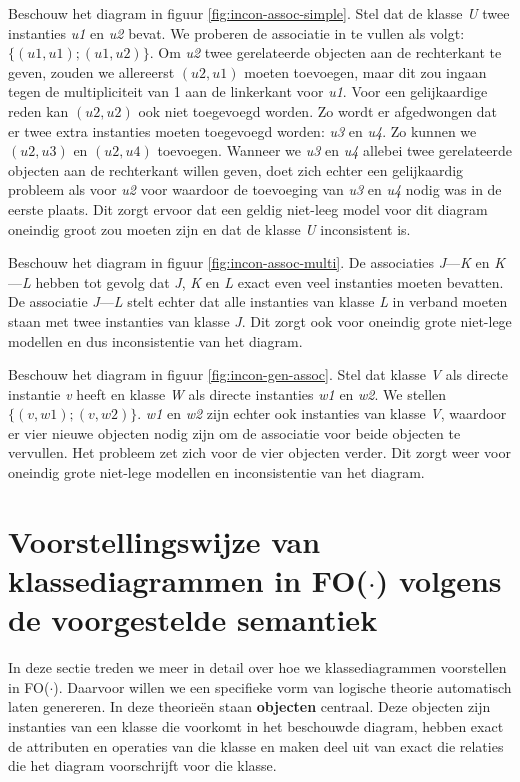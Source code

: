 Beschouw het diagram in figuur \ref{fig:incon-assoc-simple}. Stel dat de klasse \textit{U} twee instanties \textit{u1} en \textit{u2} bevat. We proberen de associatie in te vullen als volgt: $\{(u1, u1); (u1, u2)\}$. Om \textit{u2} twee gerelateerde objecten aan de rechterkant te geven, zouden we allereerst $(u2, u1)$ moeten toevoegen, maar dit zou ingaan tegen de multipliciteit van 1 aan de linkerkant voor \textit{u1}. Voor een gelijkaardige reden kan $(u2, u2)$ ook niet toegevoegd worden. Zo wordt er afgedwongen dat er twee extra instanties moeten toegevoegd worden: \textit{u3} en \textit{u4}. Zo kunnen we $(u2, u3)$ en $(u2, u4)$ toevoegen. Wanneer we \textit{u3} en \textit{u4} allebei twee gerelateerde objecten aan de rechterkant willen geven, doet zich echter een gelijkaardig probleem als voor \textit{u2} voor waardoor de toevoeging van \textit{u3} en \textit{u4} nodig was in de eerste plaats. Dit zorgt ervoor dat een geldig niet-leeg model voor dit diagram oneindig groot zou moeten zijn en dat de klasse \textit{U} inconsistent is.

Beschouw het diagram in figuur \ref{fig:incon-assoc-multi}. De associaties \textit{J}---\textit{K} en \textit{K}---\textit{L} hebben tot gevolg dat \textit{J}, \textit{K} en \textit{L} exact even veel instanties moeten bevatten. De associatie \textit{J}---\textit{L} stelt echter dat alle instanties van klasse \textit{L} in verband moeten staan met twee instanties van klasse \textit{J}. Dit zorgt ook voor oneindig grote niet-lege modellen en dus inconsistentie van het diagram.

Beschouw het diagram in figuur \ref{fig:incon-gen-assoc}. Stel dat klasse \textit{V} als directe instantie \textit{v} heeft en klasse \textit{W} als directe instanties \textit{w1} en \textit{w2}. We stellen $\{(v, w1); (v, w2)\}$. \textit{w1} en \textit{w2} zijn echter ook instanties van klasse \textit{V}, waardoor er vier nieuwe objecten nodig zijn om de associatie voor beide objecten te vervullen. Het probleem zet zich voor de vier objecten verder. Dit zorgt weer voor oneindig grote niet-lege modellen en inconsistentie van het diagram.

\section{Voorstellingswijze van klassediagrammen in FO($\cdot$) volgens de voorgestelde semantiek}\label{sec:cd-rep-cons}

In deze sectie treden we meer in detail over hoe we klassediagrammen voorstellen in FO($\cdot$). Daarvoor willen we een specifieke vorm van logische theorie automatisch laten genereren. In deze theorie\"en staan \textbf{objecten} centraal. Deze objecten zijn instanties van een klasse die voorkomt in het beschouwde diagram, hebben exact de attributen en operaties van die klasse en maken deel uit van exact die relaties die het diagram voorschrijft voor die klasse.

